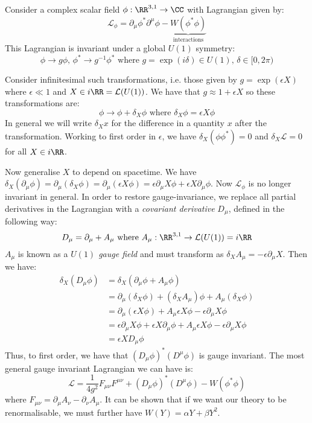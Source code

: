 \documentclass{jknotes}
\begin{document}
Consider a complex scalar field \(\phi:\RR^{3,1}\rightarrow\CC\) with Lagrangian given by:
\begin{equation}
    \mathcal{L}_\phi = \partial_\mu\phi^*\partial^\mu\phi - \underbrace{W(\phi^*\phi)}_\text{interactions}
\end{equation}
This Lagrangian is invariant under a global \(U(1)\) symmetry:
\begin{equation}
    \phi \rightarrow g \phi,\, \phi^* \rightarrow g^{-1}\phi^* \text{ where } g = \exp(i\delta) \in U(1),\, \delta \in [0,2\pi)
\end{equation}

Consider infinitesimal such transformations, i.e. those given by \(g=\exp(\epsilon X)\) where \(\epsilon \ll 1\) and \(X \in i\RR = \mathcal{L}(U(1))\). We have that \(g\approx1+\epsilon X\) so these transformations are: 
\begin{equation}
    \phi \rightarrow \phi + \delta_X\phi \text{ where } \delta_X\phi=\epsilon X\phi
\end{equation}
In general we will write \(\delta_Xx\) for the difference in a quantity \(x\) after the transformation. Working to first order in \(\epsilon\), we have \(\delta_X(\phi\phi^*) = 0\) and \(\delta_X\mathcal{L} = 0\) for all \(X \in i\RR\).

Now generalise \(X\) to depend on spacetime. We have \(\delta_X(\partial_\mu\phi) = \partial_\mu(\delta_X\phi) = \partial_\mu(\epsilon X\phi) = \epsilon \partial_\mu X \phi + \epsilon X \partial_\mu\phi\). Now \(\mathcal{L}_\phi\) is no longer invariant in general. In order to restore gauge-invariance, we replace all partial derivatives in the Lagrangian with a \emph{covariant derivative} \(D_\mu\), defined in the following way:
\begin{equation}
    D_\mu = \partial_\mu + A_\mu \text{ where } A_\mu : \RR^{3,1} \rightarrow \mathcal{L}(U(1)) = i\RR
\end{equation}
\(A_\mu\) is known as a \emph{\(U(1)\) gauge field} and must transform as \(\delta_XA_\mu = -\epsilon\partial_\mu X\). Then we have:
\begin{align}
    \delta_X(D_\mu\phi) &= \delta_X(\partial_\mu\phi + A_\mu\phi) \\
    &= \partial_\mu(\delta_X\phi) + (\delta_XA_\mu)\phi + A_\mu(\delta_X\phi) \\
    &= \partial_\mu(\epsilon X\phi) + A_\mu\epsilon X\phi - \epsilon\partial_\mu X\phi \\
    &= \epsilon \partial_\mu X\phi + \epsilon X\partial_\mu \phi + A_\mu\epsilon X\phi - \epsilon\partial_\mu X\phi \\
    &= \epsilon X D_\mu \phi
\end{align}
Thus, to first order, we have that \((D_\mu\phi)^*(D^\mu\phi)\) is gauge invariant. The most general gauge invariant Lagrangian we can have is:
\begin{equation}
    \mathcal{L} = \frac{1}{4g^2}F_{\mu\nu}F^{\mu\nu} + (D_\mu\phi)^*(D^\mu\phi) - W(\phi^*\phi)
\end{equation}
where \(F_{\mu\nu} = \partial_\mu A_\nu - \partial_\nu A_\mu\). It can be shown that if we want our theory to be renormalisable, we must further have \(W(Y) = \alpha Y + \beta Y^2\).
\end{document}
